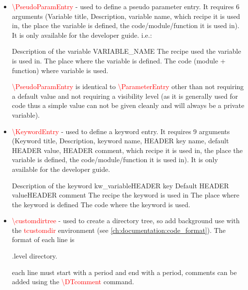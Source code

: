 \begin{itemize}
	\item \begin{minipage}[t]{\textwidth} 
	\textcolor{red}{\textbackslash{PseudoParamEntry}} - used to define a pseudo parameter entry. It requires 6 arguments (Variable title, Description, variable name, which recipe it is used in, the place the variable is defined, the code/module/function it is used in). It is only available for the developer guide. i.e.:
	\begin{latexbox}
	{Description of the variable}
	{VARIABLE\_NAME}
	{The recipe used the variable is used in.}
	{The place where the variable is defined.}
	{The code (module + function) where variable is used.}
	\end{latexbox}
	\begin{note}
	\textcolor{red}{\textbackslash{PseudoParamEntry}} is identical to \textcolor{red}{\textbackslash{ParameterEntry}} other than not requiring a default value and not requiring a visibility level (as it is generally used for code thus a simple value can not be given cleanly and will always be a private variable).
	\end{note}
	\end{minipage}

	\item \begin{minipage}[t]{\textwidth} 
	\textcolor{red}{\textbackslash{KeywordEntry}} - used to define a keyword entry. It requires 9 arguments (Keyword title, Description, keyword name, HEADER key name, default HEADER value, HEADER comment, which recipe it is used in, the place the variable is defined, the code/module/function it is used in). It is only available for the developer guide.
	\begin{latexbox}
	\KeywordEntry{Keyword title}
	{Description of the keyword}
	{kw\_variable}{HEADER key}
	{Default HEADER value}{HEADER comment}
	{The recipe the keyword is used in}
	{The place where the keyword is defined}
	{The code where the keyword is used.}
	\end{latexbox}
	\end{minipage}

	\item \begin{minipage}[t]{\textwidth} 
	\textcolor{red}{\textbackslash{customdirtree}} - used to create a directory tree, so add background use with the \textcolor{red}{tcustomdir} environment (see \ref{ch:documentation:code_format}). The format of each line is 
	\begin{textbox}
	.{level} {directory}.
	\end{textbox}
	\noindent each line must start with a period and end with a period, comments can be added using the \textcolor{red}{\textbackslash{DTcomment}} command.


\end{minipage}
\end{itemize}

